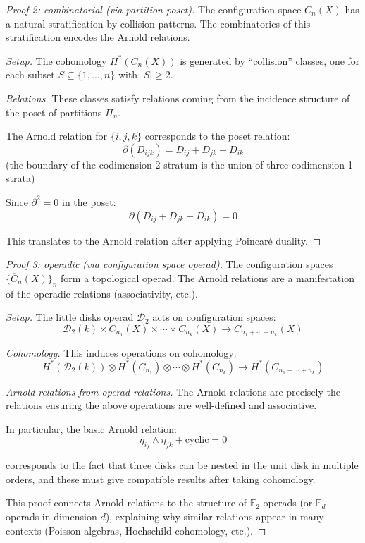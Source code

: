 \begin{proof}[Proof 2: combinatorial (via partition poset)]
The configuration space $C_n(X)$ has a natural stratification by collision patterns. The combinatorics of this stratification encodes the Arnold relations.

\emph{Setup.} The cohomology $H^*(C_n(X))$ is generated by ``collision'' classes, one for each subset $S \subseteq \{1,\ldots,n\}$ with $|S| \geq 2$.

\emph{Relations.} These classes satisfy relations coming from the incidence structure of the poset of partitions $\Pi_n$.

The Arnold relation for $\{i,j,k\}$ corresponds to the poset relation:
\[\partial(D_{ijk}) = D_{ij} + D_{jk} + D_{ik}\]
(the boundary of the codimension-2 stratum is the union of three codimension-1 strata)

Since $\partial^2 = 0$ in the poset:
\[\partial(D_{ij} + D_{jk} + D_{ik}) = 0\]

This translates to the Arnold relation after applying Poincaré duality.
\end{proof}

\begin{proof}[Proof 3: operadic (via configuration space operad)]
The configuration spaces $\{\overline{C}_n(X)\}_n$ form a topological operad. The Arnold relations are a manifestation of the operadic relations (associativity, etc.).

\emph{Setup.} The little disks operad $\mathcal{D}_2$ \cite[§5.1]{HA} acts on configuration spaces:
\[\mathcal{D}_2(k) \times C_{n_1}(X) \times \cdots \times C_{n_k}(X) \to C_{n_1+\cdots+n_k}(X)\]

\emph{Cohomology.} This induces operations on cohomology:
\[H^*(\mathcal{D}_2(k)) \otimes H^*(C_{n_1}) \otimes \cdots \otimes H^*(C_{n_k}) \to H^*(C_{n_1+\cdots+n_k})\]

\emph{Arnold relations from operad relations.} The Arnold relations are precisely the relations ensuring the above operations are well-defined and associative.

In particular, the basic Arnold relation:
\[\eta_{ij} \wedge \eta_{jk} + \text{cyclic} = 0\]

corresponds to the fact that three disks can be nested in the unit disk in multiple orders, and these must give compatible results after taking cohomology.

This proof connects Arnold relations to the structure of $\mathbb{E}_2$-operads (or $\mathbb{E}_d$-operads in dimension $d$), explaining why similar relations appear in many contexts (Poisson algebras, Hochschild cohomology, etc.).
\end{proof}

